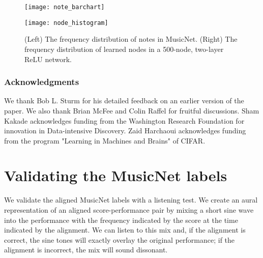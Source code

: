 \documentclass{article} \usepackage{iclr2017_conference,times}
\begin{document}
\begin{figure}[h]
  \centering
  
  \begin{minipage}{.45\textwidth}
  \texttt{[image: note\_barchart]}
\end{minipage}\begin{minipage}{.45\textwidth}
  \texttt{[image: node\_histogram]}
\end{minipage}

  \caption{(Left) The frequency distribution of notes in MusicNet. (Right) The frequency distribution of learned nodes in a 500-node, two-layer ReLU network.}
  \label{distribution}
\end{figure}



 
\subsubsection*{Acknowledgments}

We thank Bob L. Sturm for his detailed feedback on an earlier version of the paper. We also thank Brian McFee and Colin Raffel for fruitful discussions. Sham Kakade acknowledges funding from the Washington Research Foundation for innovation in Data-intensive Discovery. Zaid Harchaoui acknowledges funding from the program "Learning in Machines and Brains" of CIFAR.




\clearpage

\appendix

\section{Validating the MusicNet labels}

We validate the aligned MusicNet labels with a listening test. We create an aural representation of an aligned score-performance pair by mixing a short sine wave into the performance with the frequency indicated by the score at the time indicated by the alignment. We can listen to this mix and, if the alignment is correct, the sine tones will exactly overlay the original performance; if the alignment is incorrect, the mix will sound dissonant.
\end{document}
